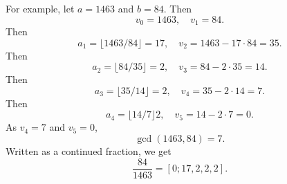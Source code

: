\documentclass{article}
\theoremstyle{definition}
\begin{document}
For example, let $a=1463$ and $b=84$. Then
\[
v_0=1463,\quad v_1 = 84.
\]
Then
\[
a_1 = \lfloor 1463/84 \rfloor = 17,\quad v_2 = 1463 - 17\cdot 84 = 35.
\]
Then
\[
a_2 = \lfloor 84/35 \rfloor = 2,\quad v_3 = 84 - 2\cdot 35 = 14.
\]
Then
\[
a_3 = \lfloor 35/14 \rfloor = 2,\quad v_4 = 35 - 2\cdot 14 = 7.
\]
Then
\[
a_4 = \lfloor 14/7 \rfloor 2,\quad v_5 = 14 - 2\cdot 7 = 0.
\]
As $v_4=7$ and $v_5=0$, 
\[
\gcd(1463,84) = 7.
\]
Written as a continued fraction, we get
\[
\frac{84}{1463} = [0;17,2,2,2].
\]
\end{document}

